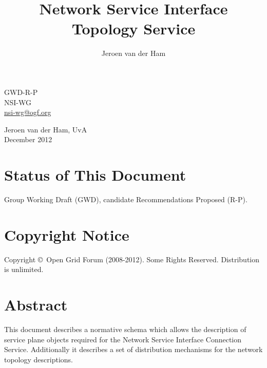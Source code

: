 \documentclass[12pt]{article}  %
\title{Network Service Interface Topology Service}
\author{Jeroen van der Ham}
\newcommand{\headerstyle}{\sffamily} %
\newcommand{\ifnonempty}[2]{\ifthenelse{\isundefined{#1}}{}{\ifthenelse{\equal{#1}{}}{}{#2}}}
\newcommand{\authorsshort}{Jeroen van der Ham, UvA}
\newcommand{\publicationdate}{December 2012}  %
\newcommand{\copyrightyears}{2008-2012}  %
\newcommand{\docseries}{GWD-R-P}  %
\begin{document}
{\noindent
\begin{minipage}[t]{1.5in}
\headerstyle
\docseries \\
NSI-WG \\
\href{mailto:nsi-wg@ogf.org}{nsi-wg@ogf.org}
\end{minipage}
\hfill
\raggedleft
\begin{minipage}[t]{4.5in}
\raggedleft
\headerstyle
\authorsshort \\
\vspace{1em}
\publicationdate \\
\ifnonempty{\revisiondate}{Revised \revisiondate \\}
\end{minipage}
}

\vspace{1em}
\begin{center}
\makeatletter
\Large\bf\textsf \@title
\makeatother
\end{center}


\section*{Status of This Document}

Group Working Draft (GWD), candidate Recommendations Proposed (R-P).


% 

\section*{Copyright Notice}

Copyright \copyright \ Open Grid Forum (\copyrightyears).  Some Rights Reserved.  
Distribution is unlimited.

\section*{Abstract}

This document describes a normative schema which allows the
description of service plane objects required for the Network Service Interface Connection Service. Additionally it describes a set of distribution mechanisms for the network topology descriptions.
\end{document}
